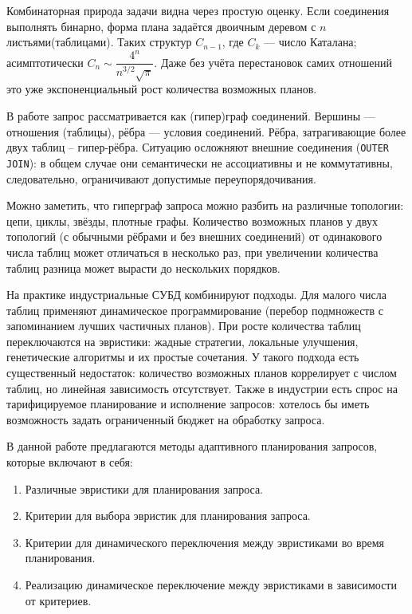 \begin{flushleft}
Комбинаторная природа задачи видна через простую оценку. Если соединения выполнять бинарно, форма плана задаётся двоичным деревом 
с \(n\) листьями(таблицами). Таких структур \(C_{n-1}\), где \(C_k\) — число Каталана; асимптотически \(C_n \sim \dfrac{4^n}{n^{3/2}\sqrt{\pi}}\). 
Даже без учёта перестановок самих отношений это уже экспоненциальный рост количества возможных планов.
\newline

В работе запрос рассматривается как (гипер)граф соединений. Вершины — отношения (таблицы), рёбра — условия соединений. Рёбра, 
затрагивающие более двух таблиц -- гипер-рёбра. 
Ситуацию осложняют внешние соединения (\texttt{OUTER JOIN}): в общем случае они семантически не ассоциативны и не коммутативны, 
следовательно, ограничивают допустимые переупорядочивания.
\newline

Можно заметить, что гиперграф запроса можно разбить на различные топологии: цепи, циклы, звёзды, плотные графы. Количество 
возможных планов у двух топологий (с обычными рёбрами и без внешних соединений) от одинакового числа таблиц может отличаться в несколько 
раз, при увеличении количества таблиц разница может вырасти до нескольких порядков.
\newline

На практике индустриальные СУБД комбинируют подходы. Для малого числа таблиц применяют динамическое программирование (перебор 
подмножеств с запоминанием лучших частичных планов). При росте количества таблиц переключаются на эвристики: жадные 
стратегии, локальные улучшения, генетические алгоритмы и их простые сочетания. У такого подхода есть существенный недостаток: 
количество возможных планов коррелирует с числом таблиц, но линейная зависимость отсутствует.
Также в индустрии есть спрос на тарифицируемое планирование и исполнение запросов: хотелось бы иметь возможность задать ограниченный 
бюджет на обработку запроса.
\newline

В данной работе предлагаются методы адаптивного планирования запросов, которые включают в себя:
\begin{enumerate}
  \item Различные эвристики для планирования запроса.
  \item Критерии для выбора эвристик для планирования запроса.
  \item Критерии для динамического переключения между эвристиками во время планирования.
  \item Реализацию динамическое переключение между эвристиками в зависимости от критериев. 
\end{enumerate}
\end{flushleft}